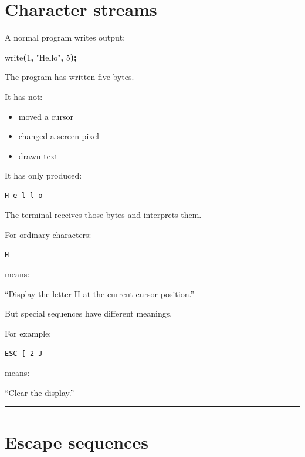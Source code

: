 \documentclass[
  oneside,
  openany]{book}
\newenvironment{Shaded}{\begin{snugshade}}{\end{snugshade}}
\newcommand{\DecValTok}[1]{\textcolor[rgb]{0.00,0.00,0.81}{#1}}
\newcommand{\NormalTok}[1]{#1}
\newcommand{\OperatorTok}[1]{\textcolor[rgb]{0.81,0.36,0.00}{\textbf{#1}}}
\newcommand{\StringTok}[1]{\textcolor[rgb]{0.31,0.60,0.02}{#1}}
\providecommand{\tightlist}{%
  \setlength{\itemsep}{0pt}\setlength{\parskip}{0pt}}
\begin{document}
\hypertarget{character-streams}{%
\section{Character streams}\label{character-streams}}

A normal program writes output:

\begin{Shaded}
\begin{Highlighting}[]
\NormalTok{write}\OperatorTok{(}\DecValTok{1}\OperatorTok{,} \StringTok{"Hello"}\OperatorTok{,} \DecValTok{5}\OperatorTok{);}
\end{Highlighting}
\end{Shaded}

The program has written five bytes.

It has not:

\begin{itemize}
\tightlist
\item
  moved a cursor
\item
  changed a screen pixel
\item
  drawn text
\end{itemize}

It has only produced:

\begin{verbatim}
H e l l o
\end{verbatim}

The terminal receives those bytes and interprets them.

For ordinary characters:

\begin{verbatim}
H
\end{verbatim}

means:

``Display the letter H at the current cursor position.''

But special sequences have different meanings.

For example:

\begin{verbatim}
ESC [ 2 J
\end{verbatim}

means:

``Clear the display.''

\begin{center}\rule{0.5\linewidth}{0.5pt}\end{center}

\hypertarget{escape-sequences}{%
\section{Escape sequences}\label{escape-sequences}}
\end{document}
